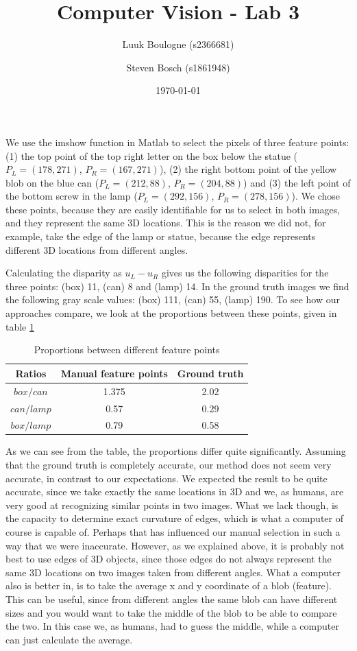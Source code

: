 \documentclass{article}
\title{Computer Vision - Lab 3}
\author{Luuk Boulogne (s2366681) \and Steven Bosch (s1861948)}
\date{\today}
\begin{document}
\maketitle

\section{}
We use the imshow function in Matlab to select the pixels of three feature points: (1) the top point of the top right letter on the box below the statue ($P_L = (178,271)$, $P_R = (167,271)$), (2) the right bottom point of the yellow blob on the blue can ($P_L = (212, 88)$, $P_R = (204, 88)$) and (3) the left point of the bottom screw in the lamp ($P_L = (292,156)$, $P_R = (278,156)$). We chose these points, because they are easily identifiable for us to select in both images, and they represent the same 3D locations. This is the reason we did not, for example, take the edge of the lamp or statue, because the edge represents different 3D locations from different angles. 

Calculating the disparity as $u_L - u_R$ gives us the following disparities for the three points: (box) 11, (can) 8 and (lamp) 14. In the ground truth images we find the following gray scale values: (box) 111, (can) 55, (lamp) 190. To see how our approaches compare, we look at the proportions between these points, given in table \ref{table1}

\begin{table}[!ht]
 \centering
 \caption{Proportions between different feature points}
 \begin{tabular}{c|c|c}
 Ratios & Manual feature points & Ground truth \\
 \hline
 $box/can$ & 1.375 & 2.02 \\
 $can/lamp$ & 0.57 & 0.29 \\
 $box/lamp$ & 0.79 & 0.58
 \end{tabular}
 \label{table1}
\end{table}

As we can see from the table, the proportions differ quite significantly. Assuming that the ground truth is completely accurate, our method does not seem very accurate, in contrast to our expectations. We expected the result to be quite accurate, since we take exactly the same locations in 3D and we, as humans, are very good at recognizing similar points in two images. What we lack though, is the capacity to determine exact curvature of edges, which is what a computer of course is capable of. Perhaps that has influenced our manual selection in such a way that we were inaccurate. However, as we explained above, it is probably not best to use edges of 3D objects, since those edges do not always represent the same 3D locations on two images taken from different angles. What a computer also is better in, is to take the average x and y coordinate of a blob (feature). This can be useful, since from different angles the same blob can have different sizes and you would want to take the middle of the blob to be able to compare the two. In this case we, as humans, had to guess the middle, while a computer can just calculate the average.
\end{document}
